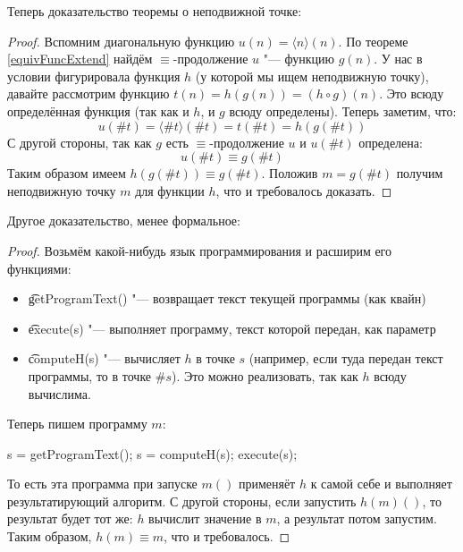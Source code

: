 Теперь доказательство теоремы о неподвижной точке:
\begin{proof}
	Вспомним диагональную функцию $u(n) = \langle n \rangle(n)$.
	По теореме \ref{equivFuncExtend} найдём $\equiv$-продолжение $u$ "--- функцию $g(n)$.
	У нас в условии фигурировала функция $h$ (у которой мы ищем неподвижную точку),
	давайте рассмотрим функцию $t(n)=h(g(n))=(h \circ g)(n)$.
	Это всюду определённая функция (так как и $h$, и $g$ всюду определены).
	Теперь заметим, что:
	\[ u(\# t) = \langle \# t \rangle (\# t) = t(\# t) = h(g(\# t)) \]
	С другой стороны, так как $g$ есть $\equiv$-продолжение $u$ и $u(\# t)$ определена:
	\[ u(\# t) \equiv g(\# t) \]
	Таким образом имеем $h(g(\# t)) \equiv g(\# t)$.
	Положив $m=g(\# t)$ получим неподвижную точку $m$ для функции $h$, что и требовалось доказать.
\end{proof}
Другое доказательство, менее формальное:
\begin{proof}
	Возьмём какой-нибудь язык программирования и расширим его функциями:
	\begin{itemize}
		\item \t{getProgramText()} "--- возвращает текст текущей программы (как квайн)
		\item \t{execute(s)} "--- выполняет программу, текст которой передан, как параметр
		\item
			\t{computeH(s)} "--- вычисляет $h$ в точке $s$ (например, если туда передан текст программы, то в точке $\# s$).
			Это можно реализовать, так как $h$ всюду вычислима.
	\end{itemize}
	Теперь пишем программу $m$:
	\begin{abstractcode}
s = getProgramText();
s = computeH(s);
execute(s);
	\end{abstractcode}
	То есть эта программа при запуске $m()$ применяёт $h$ к самой себе и выполняет результатирующий алгоритм.
	С другой стороны, если запустить $h(m)()$, то результат будет тот же: $h$ вычислит значение в $m$, а результат потом запустим.
	Таким образом, $h(m) \equiv m$, что и требовалось.
\end{proof}


